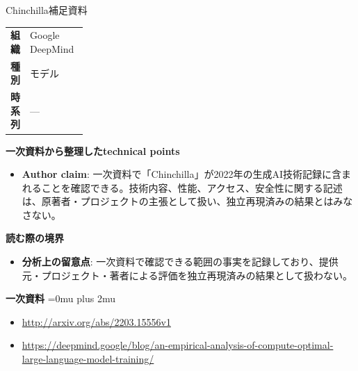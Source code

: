 \begin{technicalnote}{Chinchilla}{補足資料}
\begingroup
\begin{tabularx}{\linewidth}{@{}>{\bfseries}p{0.22\linewidth}X@{}}
組織 & Google DeepMind \\
種別 & モデル \\
時系列 & — \\
\end{tabularx}
\smallskip
{\bfseries 一次資料から整理したtechnical points}
\begin{itemize}[leftmargin=1.5em,itemsep=0.35em]
\item \textbf{Author claim}: 一次資料で「Chinchilla」が2022年の生成AI技術記録に含まれることを確認できる。技術内容、性能、アクセス、安全性に関する記述は、原著者・プロジェクトの主張として扱い、独立再現済みの結果とはみなさない。
\end{itemize}
\begin{minipage}{\linewidth}
{\bfseries 読む際の境界}
\begin{itemize}[leftmargin=1.5em,itemsep=0.35em]
\item \textbf{分析上の留意点}: 一次資料で確認できる範囲の事実を記録しており、提供元・プロジェクト・著者による評価を独立再現済みの結果として扱わない。
\end{itemize}
\begin{samepage}
{\bfseries 一次資料}
\begingroup\sloppy
\Urlmuskip=0mu plus 2mu\relax
\begin{itemize}[leftmargin=1.5em,itemsep=0.25em]
\item {\scriptsize\url{http://arxiv.org/abs/2203.15556v1}}
\item {\scriptsize\url{https://deepmind.google/blog/an-empirical-analysis-of-compute-optimal-large-language-model-training/}}
\end{itemize}
\endgroup
\end{samepage}
\end{minipage}
\endgroup
\end{technicalnote}
\medskip

